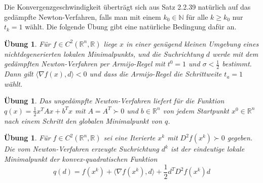 \documentclass[11pt]{scrreprt}
\newcounter{thm}
\theoremstyle{thmstyle}
\numberwithin{thm}{section}
\newtheorem{uebung}[thm]{Übung}
\begin{document}
Die Konvergenzgeschwindigkeit überträgt sich aus Satz 2.2.39 natürlich auf das gedämpfte Newton-Verfahren, falls man mit einem $k_0 \in \mathbb{N}$ für alle $k \geq k_0$ nur $t_k = 1$ wählt. Die folgende Übung gibt eine natürliche Bedingung dafür an.

\begin{uebung}
	Für $f \in C^2(\mathbb{R}^n, \mathbb{R})$ liege $x$ in einer genügend kleinen Umgebung eines nichtdegenerierten lokalen Minimalpunkts, und die Suchrichtung $d$ werde mit dem gedämpften Newton-Verfahren per Armijo-Regel mit $t^0 = 1$ und $\sigma < \frac{1}{2}$ bestimmt. Dann gilt $\langle \nabla f(x), d \rangle < 0$ und dass die Armijo-Regel die Schrittweite $t_a = 1$ wählt.
\end{uebung}

\begin{uebung}
	Das ungedämpfte Newton-Verfahren liefert für die Funktion $q(x) = \frac{1}{2} x^T A x + b^T x$ mit $A = A^T \succ 0$ und $b \in \mathbb{R}^n$ von jedem Startpunkt $x^0 \in \mathbb{R}^n$ nach einem Schritt den globalen Minimalpunkt von $q$.
\end{uebung}

\begin{uebung}
	Für $f \in C^2(\mathbb{R}^n, \mathbb{R})$ sei eine Iterierte $x^k$ mit $D^2 f(x^k) \succ 0$ gegeben. Die vom Newton-Verfahren erzeugte Suchrichtung $d^k$ ist der eindeutige lokale Minimalpunkt der konvex-quadratischen Funktion 
	$$ q(d) = f(x^k) + \langle \nabla f(x^k) , d \rangle + \frac{1}{2} d^T D^2 f(x^k) d $$
\end{uebung}
\end{document}
